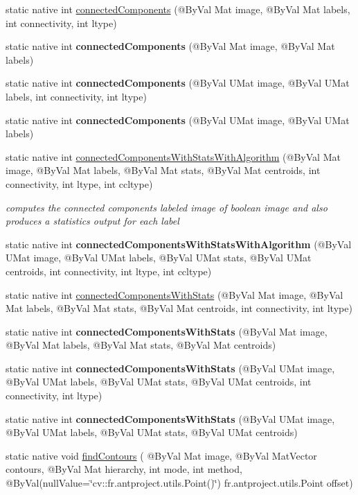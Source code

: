 \begin{DoxyCompactItemize}
\item 
static native int \hyperlink{group__imgproc__shape_gad3b372e7de7a736c55ae6707238019cf}{connected\+Components} (@By\+Val Mat image, @By\+Val Mat labels, int connectivity, int ltype)
\item 
static native int {\bfseries connected\+Components} (@By\+Val Mat image, @By\+Val Mat labels)
\item 
static native int {\bfseries connected\+Components} (@By\+Val U\+Mat image, @By\+Val U\+Mat labels, int connectivity, int ltype)
\item 
static native int {\bfseries connected\+Components} (@By\+Val U\+Mat image, @By\+Val U\+Mat labels)
\item 
static native int \hyperlink{group__imgproc__shape_gaed0a27b064f9360aa2cdfc5368f6c81c}{connected\+Components\+With\+Stats\+With\+Algorithm} (@By\+Val Mat image, @By\+Val Mat labels, @By\+Val Mat stats, @By\+Val Mat centroids, int connectivity, int ltype, int ccltype)
\begin{DoxyCompactList}\small\item\em computes the connected components labeled image of boolean image and also produces a statistics output for each label \end{DoxyCompactList}\item 
static native int {\bfseries connected\+Components\+With\+Stats\+With\+Algorithm} (@By\+Val U\+Mat image, @By\+Val U\+Mat labels, @By\+Val U\+Mat stats, @By\+Val U\+Mat centroids, int connectivity, int ltype, int ccltype)
\item 
static native int \hyperlink{group__imgproc__shape_gab229ea94bd41ec2bbcda17ba9d2968fe}{connected\+Components\+With\+Stats} (@By\+Val Mat image, @By\+Val Mat labels, @By\+Val Mat stats, @By\+Val Mat centroids, int connectivity, int ltype)
\item 
static native int {\bfseries connected\+Components\+With\+Stats} (@By\+Val Mat image, @By\+Val Mat labels, @By\+Val Mat stats, @By\+Val Mat centroids)
\item 
static native int {\bfseries connected\+Components\+With\+Stats} (@By\+Val U\+Mat image, @By\+Val U\+Mat labels, @By\+Val U\+Mat stats, @By\+Val U\+Mat centroids, int connectivity, int ltype)
\item 
static native int {\bfseries connected\+Components\+With\+Stats} (@By\+Val U\+Mat image, @By\+Val U\+Mat labels, @By\+Val U\+Mat stats, @By\+Val U\+Mat centroids)
\item 
static native void \hyperlink{group__imgproc__shape_gad95c6aa001eb4a24cc898ff08dcb81da}{find\+Contours} ( @By\+Val Mat image, @By\+Val Mat\+Vector contours, @By\+Val Mat hierarchy, int mode, int method, @By\+Val(null\+Value=\char`\"{}cv\+::\+fr.antproject.utils.Point()\char`\"{}) fr.antproject.utils.Point offset)

\end{DoxyCompactItemize}
